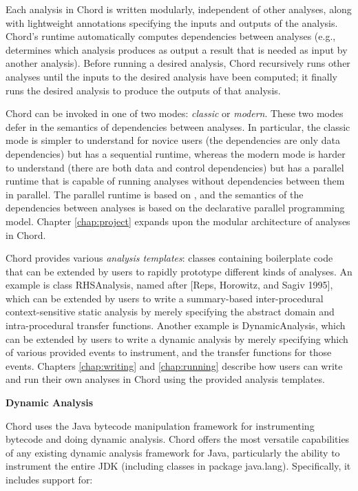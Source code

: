 Each analysis in Chord is written modularly, independent of other analyses,
along with lightweight annotations specifying the inputs and outputs of the
analysis.  Chord's runtime automatically computes dependencies between analyses
(e.g., determines which analysis produces as output a result that is needed as
input by another analysis).  Before running a desired analysis, Chord
recursively runs other analyses until the inputs to the desired analysis have
been computed; it finally runs the desired analysis to produce the outputs of
that analysis.

Chord can be invoked in one of two modes: {\it classic} or {\it modern}.  These
two modes defer in the semantics of dependencies between analyses.  In
particular, the classic mode is simpler to understand for novice users (the
dependencies are only data dependencies) but has a sequential runtime, whereas
the modern mode is harder to understand (there are both data and control
dependencies) but has a parallel runtime that is capable of running analyses
without dependencies between them in parallel.  The parallel runtime is based on
, and the semantics of
the dependencies between analyses is based on the
declarative parallel programming model.  Chapter \ref{chap:project} expands upon
the modular architecture of analyses in Chord.

Chord provides various {\it analysis templates}: classes containing boilerplate
code that can be extended by users to rapidly prototype different kinds of
analyses.  An example is class RHSAnalysis, named after [Reps, Horowitz, and
Sagiv 1995], which can be extended by users to write a summary-based
inter-procedural context-sensitive static analysis by merely specifying the
abstract domain and intra-procedural transfer functions.  Another example is
DynamicAnalysis, which can be extended by users to write a dynamic analysis by
merely specifying which of various provided events to instrument, and the
transfer functions for those events.  Chapters \ref{chap:writing} and
\ref{chap:running} describe how users can write and run their own analyses in
Chord using the provided analysis templates.

{\bf Dynamic Analysis}

Chord uses the  Java bytecode
manipulation framework for instrumenting bytecode and doing dynamic analysis.
Chord offers the most versatile capabilities of any existing dynamic analysis
framework for Java, particularly the ability to instrument the entire JDK
(including classes in package java.lang).  Specifically, it includes support
for:

